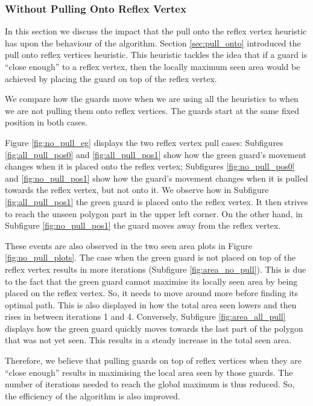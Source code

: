\subsubsection{Without Pulling Onto Reflex Vertex}
In this section we discuss the impact that the pull onto the reflex vertex heuristic has upon the behaviour of the algorithm. Section \ref{sec:pull_onto} introduced the pull onto reflex vertices heuristic. This heuristic tackles the idea that if a guard is ``close enough'' to a reflex vertex, then the locally maximum seen area would be achieved by placing the guard on top of the reflex vertex. 

We  compare how the guards move when we are using all the heuristics to when we are not pulling them onto reflex vertices. The guards  start at the same fixed position in both cases.

Figure \ref{fig:no_pull_eg} displays the two reflex vertex pull cases: Subfigures \ref{fig:all_pull_pos0} and \ref{fig:all_pull_pos1} show how the green guard's movement changes when it is placed onto the reflex vertex; Subfigures \ref{fig:no_pull_pos0} and \ref{fig:no_pull_pos1} show how the guard's movement changes when it is pulled towards the reflex vertex, but not onto it. We  observe how in Subfigure \ref{fig:all_pull_pos1} the green guard is placed onto the reflex vertex. It then strives to reach the unseen polygon part in the upper left corner. On the other hand, in Subfigure \ref{fig:no_pull_pos1} the guard moves away from the reflex vertex.

These events are also observed in the two seen area plots in Figure \ref{fig:no_pull_plots}. The case when the green guard is not placed on top of the reflex vertex results in more iterations (Subfigure \ref{fig:area_no_pull}). This is due to the fact that the green guard cannot maximise its locally seen area by being placed on the reflex vertex. So, it needs to move around more before finding its optimal path. This is also displayed in how the total area seen lowers and then rises in between iterations 1 and 4. Conversely, Subfigure \ref{fig:area_all_pull} displays how the green guard quickly moves towards the last part of the polygon that was not yet seen. This results in a steady increase in the total seen area.

Therefore, we believe that pulling guards on top of reflex vertices when they are ``close enough'' results in maximising the local area seen by those guards. The number of iterations needed to reach the global maximum is thus reduced. So, the efficiency of the algorithm is also improved.

